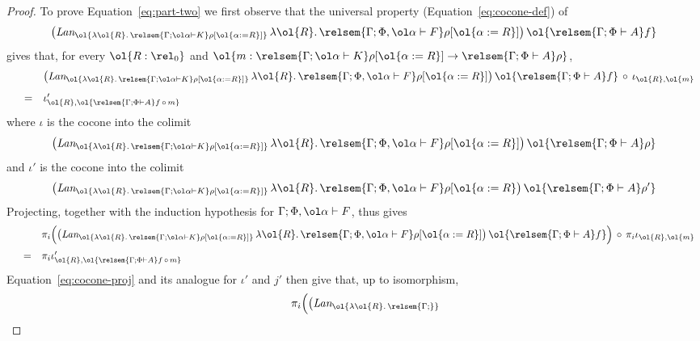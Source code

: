 \documentclass{lmcs}
\theoremstyle{plain}\newtheorem{satz}[thm]{Satz}
\begin{document}
\begin{proof}
\vspace*{0.1in}

To prove Equation~\ref{eq:part-two} we first observe that 
  the universal property (Equation~\ref{eq:cocone-def}) of 
\[
\big(\textit{Lan}_{\ol{\lambda \ol{R}.\,\relsem{\Gamma; \ol\alpha
      \vdash K}\rho[\ol{\alpha := R}]}}\, \lambda
\ol{R}.\,\relsem{\Gamma; \Phi, \ol\alpha \vdash F}\rho[\ol{\alpha :=
    R}]\big)\, \ol{\relsem{\Gamma; \Phi \vdash A}f}
\] gives that,
for every $\ol{R : \rel_0}$ and $\ol{m : \relsem{\Gamma; \ol\alpha
    \vdash K}\rho[\ol{\alpha := R}] \to \relsem{\Gamma; \Phi \vdash
    A}\rho}$, 
\[\begin{array}{lll}
 & & \big(\textit{Lan}_{\ol{\lambda \ol{R}.\,\relsem{\Gamma; \ol\alpha
      \vdash K}\rho[\ol{\alpha := R}]}}\, \lambda
\ol{R}.\,\relsem{\Gamma; \Phi, \ol\alpha \vdash F}\rho[\ol{\alpha :=
    R}]\big)\, \ol{\relsem{\Gamma; \Phi \vdash A}f} \,\circ\,
\iota_{\ol{R}, \ol{m}}\\[2ex]
& = & \iota'_{\ol{R}, \ol{\relsem{\Gamma; \Phi \vdash A}f \,\circ\,
    m}}
\end{array}\]
where $\iota$ is the cocone into the colimit
\[
\big(\textit{Lan}_{\ol{\lambda \ol{R}.\,\relsem{\Gamma; \ol\alpha
      \vdash K}\rho[\ol{\alpha := R}]}}\, \lambda
\ol{R}.\,\relsem{\Gamma; \Phi, \ol\alpha \vdash F}\rho[\ol{\alpha :=
    R}]\big)\, \ol{\relsem{\Gamma; \Phi \vdash A}\rho}
\]
and $\iota'$ is the cocone into the colimit
\[\big(\textit{Lan}_{\ol{\lambda \ol{R}.\,\relsem{\Gamma; \ol\alpha
 \vdash K}\rho[\ol{\alpha := R}]}}\, \lambda \ol{R}.\,\relsem{\Gamma;
  \Phi, \ol\alpha \vdash F}\rho[\ol{\alpha := R}\big)\,
  \ol{\relsem{\Gamma; \Phi \vdash A}\rho'}
\]
Projecting, together with the induction hypothesis for
$\Gamma;\Phi,\ol\alpha\vdash F$, thus gives
\[\begin{array}{lll}
 & & \pi_i \Big( \big(\textit{Lan}_{\ol{\lambda
    \ol{R}.\,\relsem{\Gamma; \ol\alpha 
    \vdash K}\rho[\ol{\alpha := R}]}}\,  
    \lambda \ol{R}.\,\relsem{\Gamma; \Phi, \ol\alpha \vdash
      F}\rho[\ol{\alpha := R}]\big)\, 
    \ol{\relsem{\Gamma; \Phi \vdash A}f} \Big)
\,\circ\, \pi_i \iota_{\ol{R}, \ol{m}} \\[2ex]
& = & \pi_i \iota'_{\ol{R}, \ol{\relsem{\Gamma; \Phi \vdash A}f \,\circ\,
    m}} 
\end{array}\]
Equation~\ref{eq:cocone-proj} and its analogue for
  $\iota'$ and $j'$ then give that, up to isomorphism,
\[\begin{array}{lll}
 & & \pi_i \Big( \big(\textit{Lan}_{\ol{\lambda \ol{R}.\,\relsem{\Gamma;
}}}
\end{array}\]
\end{proof}
\end{document}
